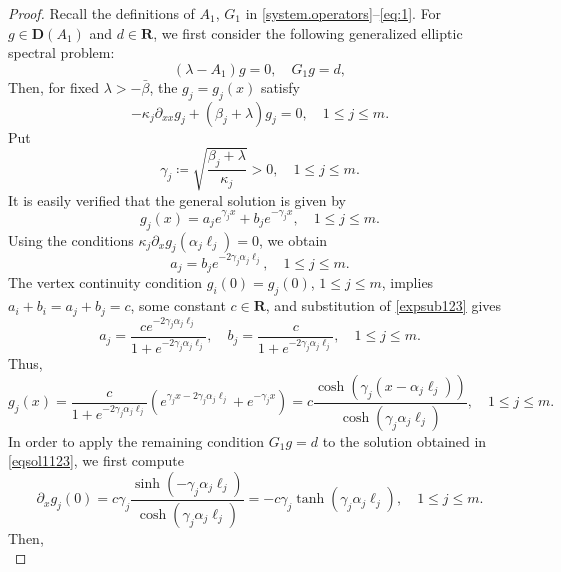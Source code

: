\documentclass[10pt,a4paper]{amsart}
\def\R{\mathbf{R}}
\begin{document}
\begin{proof}
Recall the definitions of $A_1$, $G_1$ in \eqref{system.operators}--\eqref{eq:1}. For $g\in \bm{D}({A}_1)$ and $d\in \R$, we first consider the following generalized elliptic spectral problem:
\begin{equation*}
(\lambda-A_1)g=0,\quad G_1 g=d,
\end{equation*}
Then, for fixed $\lambda > -\bar{\beta}$, the $g_j=g_j(x)$ satisfy
\begin{equation*}
-\kappa_j \partial_{xx} g_j + (\beta_j+\lambda) g_j = 0,\quad 1 \le j\le m.
\end{equation*}
Put
\begin{equation}\label{expsubd123}
 \gamma_j \coloneqq \sqrt{\frac{\beta_j + \lambda}{\kappa_j}} > 0,\quad 1 \le j\le m.
\end{equation}
It is easily verified that the general solution is given by
\begin{equation*}
g_j(x) = a_j e^{\gamma_j x} + b_j e^{-\gamma_j x},\quad 1 \le j\le m.
\end{equation*}
Using the conditions $ \kappa_j \partial_x g_j(\alpha_j \ell_j) = 0$, we obtain
\begin{equation}\label{expsub123}
a_j = b_j e^{-2\gamma_j \alpha_j \ell_j},\quad 1 \le j\le m.
\end{equation}
The vertex continuity condition $g_i(0)=g_j(0)$, $1 \le j\le m$, implies $a_i + b_i =a_j + b_j= c$, some constant $c\in \R$, and substitution of \eqref{expsub123} gives
\begin{equation*}
a_j=\frac{ce^{-2\gamma_j \alpha_j \ell_j}}{1+e^{-2\gamma_j \alpha_j \ell_j}},\quad b_j=\frac{c}{1+e^{-2\gamma_j \alpha_j \ell_j}},\quad 1 \le j\le m.
\end{equation*}
Thus,
\begin{equation}\label{eqsol1123}
g_j(x) = \frac{c}{1 + e^{-2\gamma_j \alpha_j \ell_j}} \left( e^{\gamma_j x - 2\gamma_j \alpha_j \ell_j} + e^{-\gamma_j x} \right)
=c\frac{\cosh(\gamma_j (x - \alpha_j \ell_j))}{\cosh(\gamma_j \alpha_j \ell_j)},\quad 1 \le j\le m.
\end{equation}
In order to apply the remaining condition $G_1 g = d$ to the solution obtained in \eqref{eqsol1123}, we first compute
\begin{equation*}
\partial_x g_j(0) = c\gamma_j\frac{\sinh(-\gamma_j \alpha_j \ell_j)}{\cosh(\gamma_j \alpha_j \ell_j)}=-c\gamma_j \tanh(\gamma_j \alpha_j \ell_j),\quad 1 \le j\le m.
\end{equation*}
Then,
\begin{equation*}

\end{equation*}
\end{proof}
\end{document}
